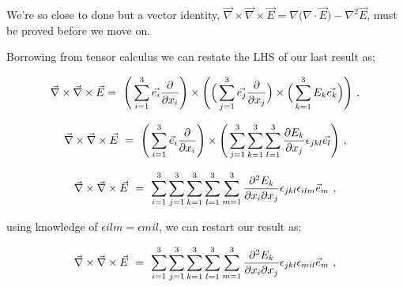 \documentclass{article}
\begin{document}
We're so close to done but a vector identity, \begin{math} \vec{\nabla}\times\vec{\nabla}\times\vec{E} = \nabla\big(\nabla\cdot\vec{E}\big) - \nabla^{2}\vec{E} \end{math}, must be proved before we move on.

Borrowing from tensor calculus we can restate the LHS of our last result as; 

\begin{equation} \label{eq:1002}
\vec{\nabla}\times\vec{\nabla}\times\vec{E} = \hspace{0.125cm} \Bigg( \sum_{i=1}^{3} \vec{e_{i}} \frac{\partial}{\partial x_i} \Bigg)\times\Bigg( \Big( \sum_{j=1}^{3} \vec{e_j} \frac{\partial}{\partial x_j} \Big)\times\Big( \sum_{k=1}^{3} E_k \vec{e_k}\Big) \Bigg) \hspace{0.125cm}. 
\end{equation}

\begin{equation} \label{eq:51}
\vec{\nabla}\times\vec{\nabla}\times\vec{E} \hspace{0.125cm} = \hspace{0.125cm} \Bigg( \sum_{i=1}^{3} \vec{e}_i \frac{\partial}{\partial x_i} \Bigg)\times\Bigg( \sum_{j=1}^{3} \sum_{k=1}^{3} \sum_{l=1}^{3} \frac{\partial{E_k}}{\partial x_j}  \epsilon_{jkl} \vec{e_l} \Bigg) \hspace{0.125cm} ,
\end{equation}

\begin{equation} \label{eq:51}
\vec{\nabla}\times\vec{\nabla}\times\vec{E} \hspace{0.125cm} = \hspace{0.125cm} \sum_{i=1}^{3} \sum_{j=1}^{3} \sum_{k=1}^{3} \sum_{l=1}^{3} \sum_{m=1}^{3} \frac{\partial^{2}{E_k}}{\partial{x_i}\partial{x_j}} \epsilon_{jkl} \epsilon_{ilm} \vec{e}_m \hspace{0.125cm} ,
\end{equation}

using knowledge of \begin{math} \epsilon{ilm} = \epsilon{mil} \end{math}, we can restart our result as;

\begin{equation} \label{eq:51}
\vec{\nabla}\times\vec{\nabla}\times\vec{E} \hspace{0.125cm} = \hspace{0.125cm} \sum_{i=1}^{3} \sum_{j=1}^{3} \sum_{k=1}^{3} \sum_{l=1}^{3} \sum_{m=1}^{3} \frac{\partial^{2}{E_k}}{\partial{x_i}\partial{x_j}} \epsilon_{jkl} \epsilon_{mil} \vec{e}_m \hspace{0.125cm} ,
\end{equation}
\end{document}
